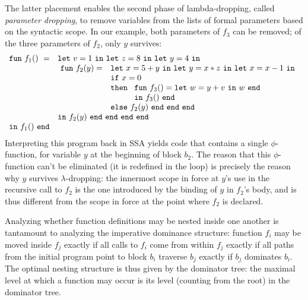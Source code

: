 The latter placement enables the second phase of
lambda-dropping, called
\emph{parameter dropping}, to remove variables from the lists of
formal parameters based on the syntactic scope. In our example, both
parameters of $f_3$ can be removed; of the three parameters of $f_2$,
only $y$ survives:
$$
\begin{array}{ll}
\mathtt{fun}\ f_1()\ = & \mathtt{let}\ v = 1 \ 
                  \mathtt{in\ let}\ z = 8 \ 
                  \mathtt{in\ let}\ y = 4\ \mathtt{in}\\
&\! \begin{array}{ll}
     \mathtt{fun}\ f_2(y) = &
     \mathtt{let}\ x = 5+y\
     \mathtt{in\ let}\ y = x*z\
     \mathtt{in\ let}\ x = x-1\ \mathtt{in}\\
   & \mathtt{if}\ x=0\\ 
   &  \mathtt{then}\ 
      \begin{array}[t]{l}
         \mathtt{fun}\ f_3() = 
         \mathtt{let}\ w = y+v\ \mathtt{in}\ w\ \mathtt{end}\\
         \mathtt{in}\ f_3()\ \mathtt{end}
      \end{array}\\
   & \mathtt{else}\ f_2(y)\ \mathtt{end\ end\ end}
  \end{array}\\
& \mathtt{in}\ f_2(y)\ \mathtt{end\ end\ end\ end}\\
\mathtt{in}\ f_1()\  \mathtt{end}
\end{array}
$$
Interpreting this program back in SSA yields code that
contains a single $\phi$-function, for variable $y$ at the beginning
of block $b_2$. The reason that this $\phi$-function can't be
eliminated (it is redefined in the loop) is precisely the reason why
$y$ survives $\lambda$-dropping: the innermost scope in force at $y$'s
use in the recursive call to $f_2$ is the one introduced by the
binding of $y$ in $f_2$'s body, and is thus different from the scope
in force at the point where $f_2$ is declared.

Analyzing whether function definitions may be nested inside one
another is tantamount to analyzing the imperative dominance structure:
function $f_i$ may be moved inside $f_j$ exactly if all calls to $f_i$
come from within $f_j$ exactly if all paths from the initial program
point to block $b_i$ traverse $b_j$ exactly if $b_j$ dominates
$b_i$. The optimal nesting structure is thus given by the dominator
tree: the maximal level at which a function may occur is its level
(counting from the root) in the dominator tree.

